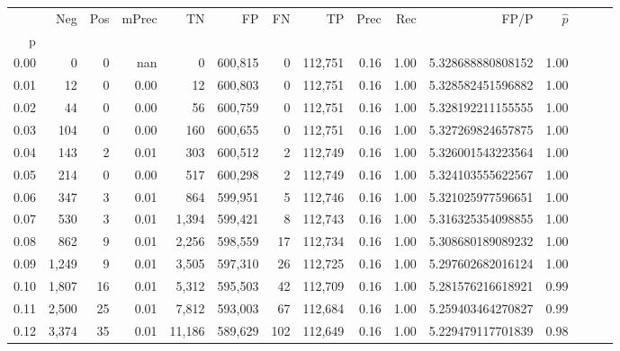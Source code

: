 \begin{tabular}{rrrrrrrrrrrrrrr}
\toprule
{} &     Neg &    Pos & mPrec &       TN &       FP &       FN &       TP &  Prec &   Rec &                    FP/P & $\hat{p}$ \\
p    &         &        &       &          &          &          &          &       &       &                         &           \\
\midrule
0.00 &       0 &      0 &   nan &        0 &  600,815 &        0 &  112,751 &  0.16 &  1.00 &       5.328688880808152 &      1.00 \\
0.01 &      12 &      0 &  0.00 &       12 &  600,803 &        0 &  112,751 &  0.16 &  1.00 &       5.328582451596882 &      1.00 \\
0.02 &      44 &      0 &  0.00 &       56 &  600,759 &        0 &  112,751 &  0.16 &  1.00 &       5.328192211155555 &      1.00 \\
0.03 &     104 &      0 &  0.00 &      160 &  600,655 &        0 &  112,751 &  0.16 &  1.00 &       5.327269824657875 &      1.00 \\
0.04 &     143 &      2 &  0.01 &      303 &  600,512 &        2 &  112,749 &  0.16 &  1.00 &       5.326001543223564 &      1.00 \\
0.05 &     214 &      0 &  0.00 &      517 &  600,298 &        2 &  112,749 &  0.16 &  1.00 &       5.324103555622567 &      1.00 \\
0.06 &     347 &      3 &  0.01 &      864 &  599,951 &        5 &  112,746 &  0.16 &  1.00 &       5.321025977596651 &      1.00 \\
0.07 &     530 &      3 &  0.01 &    1,394 &  599,421 &        8 &  112,743 &  0.16 &  1.00 &       5.316325354098855 &      1.00 \\
0.08 &     862 &      9 &  0.01 &    2,256 &  598,559 &       17 &  112,734 &  0.16 &  1.00 &       5.308680189089232 &      1.00 \\
0.09 &   1,249 &      9 &  0.01 &    3,505 &  597,310 &       26 &  112,725 &  0.16 &  1.00 &       5.297602682016124 &      1.00 \\
0.10 &   1,807 &     16 &  0.01 &    5,312 &  595,503 &       42 &  112,709 &  0.16 &  1.00 &       5.281576216618921 &      0.99 \\
0.11 &   2,500 &     25 &  0.01 &    7,812 &  593,003 &       67 &  112,684 &  0.16 &  1.00 &       5.259403464270827 &      0.99 \\
0.12 &   3,374 &     35 &  0.01 &   11,186 &  589,629 &      102 &  112,649 &  0.16 &  1.00 &       5.229479117701839 &      0.98 \\

\end{tabular}
